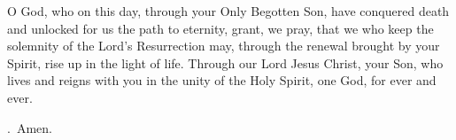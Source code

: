 \lettrine[lines=3]{O}{} God, who on this day,
through your Only Begotten Son,
have conquered death
and unlocked for us the path to eternity,
grant, we pray, that we who keep
the solemnity of the Lord’s Resurrection
may, through the renewal brought by your Spirit,
rise up in the light of life.
Through our Lord Jesus Christ, your Son,
who lives and reigns with you in the unity of the Holy Spirit,
one God, for ever and ever.
\par \Rbar.~Amen.
